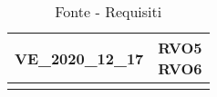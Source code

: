 \begin{longtable}[H]{| >{\centering\bfseries}p{8cm} | >{\centering\arraybackslash}p{8cm} |}
    \rowcolor{white}
    \textsc{VE\_2020\_12\_17}        &
    \makecell{
        \rule{0pt}{4ex}
    RVO5                                                                                                         \\
    RVO6                                                                                                         \\
        \rule{0pt}{2ex}
    }                                                                                                            \\

    \hline
    \rowcolor{white}
    \caption{Fonte - Requisiti}
    \label{tab:fonte_requisiti}
\end{longtable}



